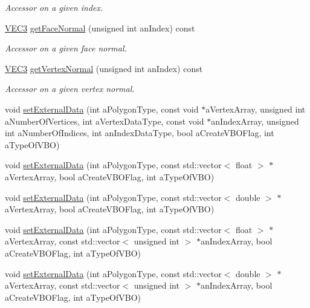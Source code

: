 \begin{DoxyCompactItemize}
\begin{DoxyCompactList}\small\item\em Accessor on a given index. \end{DoxyCompactList}\item 
\hyperlink{class_math_1_1_vec3}{VEC3} \hyperlink{class_graphics_1_1_polygon_mesh_a6d10e50e17b7e8c036d3a2a6ff6f9985}{getFaceNormal} (unsigned int anIndex) const 
\begin{DoxyCompactList}\small\item\em Accessor on a given face normal. \end{DoxyCompactList}\item 
\hyperlink{class_math_1_1_vec3}{VEC3} \hyperlink{class_graphics_1_1_polygon_mesh_a0c3e461c151fed4744ca59f19fbdd1ee}{getVertexNormal} (unsigned int anIndex) const 
\begin{DoxyCompactList}\small\item\em Accessor on a given vertex normal. \end{DoxyCompactList}\item 
void \hyperlink{class_graphics_1_1_polygon_mesh_a406d0b1a01b93e5da19d9617f9b21d16}{setExternalData} (int aPolygonType, const void $\ast$aVertexArray, unsigned int aNumberOfVertices, int aVertexDataType, const void $\ast$anIndexArray, unsigned int aNumberOfIndices, int anIndexDataType, bool aCreateVBOFlag, int aTypeOfVBO)
\item 
void \hyperlink{class_graphics_1_1_polygon_mesh_ae0a83f6105c1913081905318530697e2}{setExternalData} (int aPolygonType, const std::vector$<$ float $>$ $\ast$aVertexArray, bool aCreateVBOFlag, int aTypeOfVBO)
\item 
void \hyperlink{class_graphics_1_1_polygon_mesh_a4e54503d4fd75b586d13a4933a338601}{setExternalData} (int aPolygonType, const std::vector$<$ double $>$ $\ast$aVertexArray, bool aCreateVBOFlag, int aTypeOfVBO)
\item 
void \hyperlink{class_graphics_1_1_polygon_mesh_a02beb66b179ae5fa5f94b9ab563a04b8}{setExternalData} (int aPolygonType, const std::vector$<$ float $>$ $\ast$aVertexArray, const std::vector$<$ unsigned int $>$ $\ast$anIndexArray, bool aCreateVBOFlag, int aTypeOfVBO)
\item 
void \hyperlink{class_graphics_1_1_polygon_mesh_ae324bf6ce3f7ad3d50bdd10d565e639f}{setExternalData} (int aPolygonType, const std::vector$<$ double $>$ $\ast$aVertexArray, const std::vector$<$ unsigned int $>$ $\ast$anIndexArray, bool aCreateVBOFlag, int aTypeOfVBO)
\item 

\end{DoxyCompactItemize}
